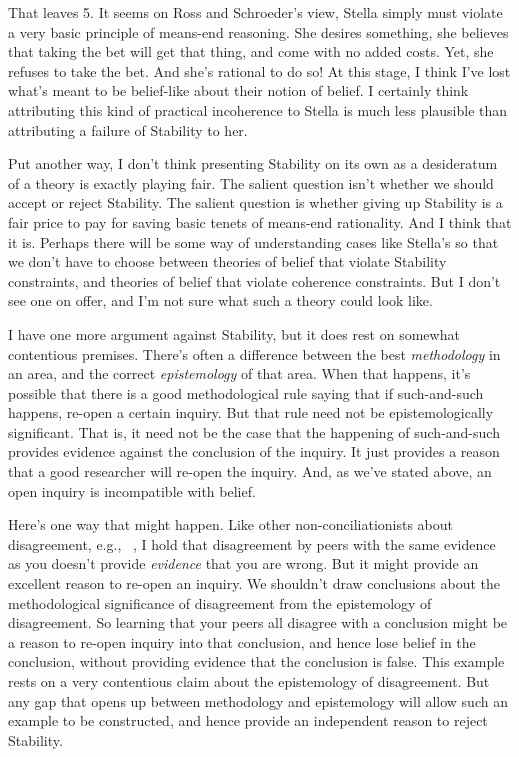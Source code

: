 That leaves 5. It seems on Ross and Schroeder's view, Stella simply must violate a very basic principle of means-end reasoning. She desires something, she believes that taking the bet will get that thing, and come with no added costs. Yet, she refuses to take the bet. And she's rational to do so! At this stage, I think I've lost what's meant to be belief-like about their notion of belief. I certainly think attributing this kind of practical incoherence to Stella is much less plausible than attributing a failure of Stability to her.

Put another way, I don't think presenting Stability on its own as a desideratum of a theory is exactly playing fair. The salient question isn't whether we should accept or reject Stability. The salient question is whether giving up Stability is a fair price to pay for saving basic tenets of means-end rationality. And I think that it is. Perhaps there will be some way of understanding cases like Stella's so that we don't have to choose between theories of belief that violate Stability constraints, and theories of belief that violate coherence constraints. But I don't see one on offer, and I'm not sure what such a theory could look like.

I have one more argument against Stability, but it does rest on somewhat contentious premises. There's often a difference between the best \emph{methodology} in an area, and the correct \emph{epistemology} of that area. When that happens, it's possible that there is a good methodological rule saying that if such-and-such happens, re-open a certain inquiry. But that rule need not be epistemologically significant. That is, it need not be the case that the happening of such-and-such provides evidence against the conclusion of the inquiry. It just provides a reason that a good researcher will re-open the inquiry. And, as we've stated above, an open inquiry is incompatible with belief.

Here's one way that might happen. Like other non-conciliationists about disagreement, e.g., ~\citep{Kelly2010-KELPDA}, I hold that disagreement by peers with the same evidence as you doesn't provide \emph{evidence} that you are wrong. But it might provide an excellent reason to re-open an inquiry. We shouldn't draw conclusions about the methodological significance of disagreement from the epistemology of disagreement. So learning that your peers all disagree with a conclusion might be a reason to re-open inquiry into that conclusion, and hence lose belief in the conclusion, without providing evidence that the conclusion is false. This example rests on a very contentious claim about the epistemology of disagreement. But any gap that opens up between methodology and epistemology will allow such an example to be constructed, and hence provide an independent reason to reject Stability.
